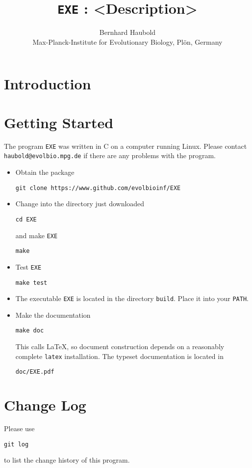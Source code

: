 \documentclass[a4paper, english]{article}
\newcommand{\bi}{\begin{itemize}}
\newcommand{\ei}{\end{itemize}}
\newcommand{\I}{\item}
\newcommand{\ty}{\texttt}
\begin{document}
\title{\ty{EXE} : <Description>}
\author{Bernhard Haubold\\\small Max-Planck-Institute for Evolutionary
  Biology, Pl\"on, Germany}
\date{}
\maketitle
\section{Introduction} 

\section{Getting Started}
The program \ty{EXE} was written in C on a computer running Linux.
Please contact \ty{haubold@evolbio.mpg.de} if there are any problems
with the program.
\bi \I Obtain the package
\begin{verbatim}
git clone https://www.github.com/evolbioinf/EXE
\end{verbatim}
\I Change into the directory just downloaded
\begin{verbatim}
cd EXE
\end{verbatim}
and make \ty{EXE}
\begin{verbatim}
make
\end{verbatim}
\I Test \ty{EXE}
\begin{verbatim}
make test
\end{verbatim}
\I The executable \ty{EXE} is located in the
directory \ty{build}. Place it into your \ty{PATH}.
\I  Make the documentation
\begin{verbatim}
make doc
\end{verbatim}
This calls \LaTeX{}, so document construction depends on a reasonably
complete \ty{latex} installation. The typeset documentation is located
in
\begin{verbatim}
doc/EXE.pdf
\end{verbatim}
\ei

\section{Change Log}
Please use
\begin{verbatim}
git log
\end{verbatim}
to list the change history of this program.


\end{document}

